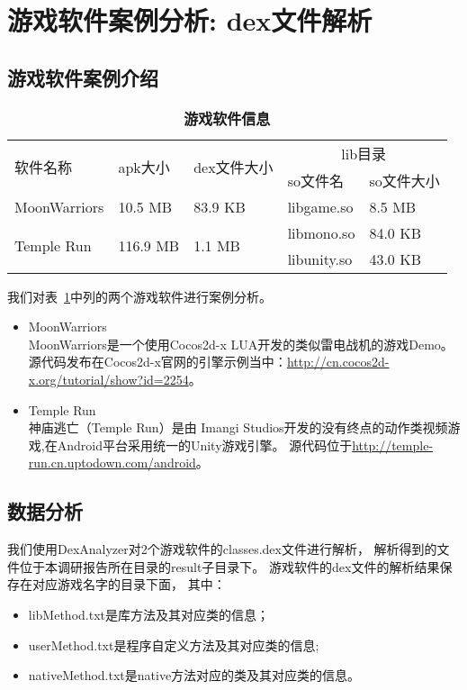 \section{游戏软件案例分析: dex文件解析}
\label{dexanalysis}
\subsection{游戏软件案例介绍}
\label{sec:dexanalysis:case}
\begin{table}[htbp]
\caption{\textbf{游戏软件信息}}
\label{tab:games}
\begin{tabular}{|p{2.5cm}|p{2cm}|p{2.1cm}|p{2cm}|p{2cm}|}
\hline
\multirow{2}{*}{软件名称} & \multirow{2}{*}{apk大小}  & \multirow{2}{*}{dex文件大小} & \multicolumn{2}{|c|}{lib目录} \\
\cline{4-5}
& & & so文件名 & so文件大小\\
\hline
MoonWarriors & 10.5 MB & 83.9 KB & libgame.so & 8.5 MB \\
\hline
\multirow{2}{*}{Temple Run} & \multirow{2}{*}{116.9 MB} & \multirow{2}{*}{1.1 MB} & libmono.so & 84.0 KB\\
\cline{4-5}
& & & libunity.so & 43.0 KB\\
\hline
\end{tabular}
\end{table}

我们对表~\ref{tab:games}中列的两个游戏软件进行案例分析。
\begin{itemize}
\item MoonWarriors\\
MoonWarriors是一个使用Cocos2d-x LUA开发的类似雷电战机的游戏Demo。
源代码发布在Cocos2d-x官网的引擎示例当中：\url{http://cn.cocos2d-x.org/tutorial/show?id=2254}。

\item Temple Run\\
神庙逃亡（Temple Run）是由 Imangi Studios开发的没有终点的动作类视频游戏,在Android平台采用统一的Unity游戏引擎。
源代码位于\url{http://temple-run.cn.uptodown.com/android}。

\end{itemize}

\subsection{数据分析}
\label{sec:dexanalysis:casestudy}
我们使用DexAnalyzer对2个游戏软件的classes.dex文件进行解析，
解析得到的文件位于本调研报告所在目录的result子目录下。
游戏软件的dex文件的解析结果保存在对应游戏名字的目录下面，
其中：
\begin{itemize}
\item libMethod.txt是库方法及其对应类的信息；
\item userMethod.txt是程序自定义方法及其对应类的信息;
\item nativeMethod.txt是native方法对应的类及其对应类的信息。
\end{itemize}

